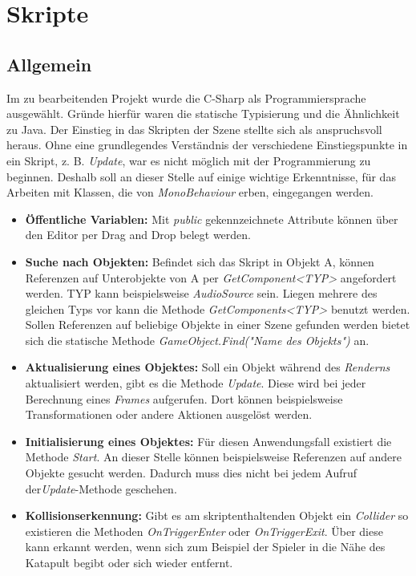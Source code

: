 \section{Skripte}
\subsection{Allgemein}
Im zu bearbeitenden Projekt wurde die C-Sharp als Programmiersprache ausgewählt. Gründe hierfür waren die statische Typisierung und die Ähnlichkeit zu Java. Der Einstieg in das Skripten der Szene stellte sich als anspruchsvoll heraus. Ohne eine grundlegendes Verständnis der verschiedene Einstiegspunkte in ein Skript, z. B. \textit{Update}, war es nicht möglich mit der Programmierung zu beginnen. Deshalb soll an dieser Stelle auf einige wichtige Erkenntnisse, für das Arbeiten mit Klassen, die von \textit{MonoBehaviour} erben, eingegangen werden.

\begin{itemize}
	\item \textbf{Öffentliche Variablen:} Mit \textit{public} gekennzeichnete Attribute können über den Editor per Drag and Drop belegt werden.
	\item \textbf{Suche nach Objekten:} Befindet sich das Skript in Objekt A, können Referenzen auf Unterobjekte von A per \textit{GetComponent<TYP>} angefordert werden. TYP kann beispielsweise \textit{AudioSource} sein. Liegen mehrere des gleichen Typs vor kann die Methode \textit{GetComponents<TYP>} benutzt werden. Sollen Referenzen auf beliebige Objekte in einer Szene gefunden werden bietet sich die statische Methode \textit{GameObject.Find("Name des Objekts")} an.
	\item \textbf{Aktualisierung eines Objektes:} Soll ein Objekt während des \textit{Renderns} aktualisiert werden, gibt es die Methode \textit{Update}. Diese wird bei jeder Berechnung eines \textit{Frames} aufgerufen. Dort können beispielsweise Transformationen oder andere Aktionen ausgelöst werden.
	\item \textbf{Initialisierung eines Objektes:} Für diesen Anwendungsfall existiert die Methode \textit{Start}. An dieser Stelle können beispielsweise Referenzen auf andere Objekte gesucht werden. Dadurch muss dies nicht bei jedem Aufruf der\textit{Update}-Methode geschehen.
	\item \textbf{Kollisionserkennung:} Gibt es am skriptenthaltenden Objekt ein \textit{Collider} so existieren die Methoden \textit{OnTriggerEnter} oder \textit{OnTriggerExit}. Über diese kann erkannt werden, wenn sich zum Beispiel der Spieler in die Nähe des Katapult begibt oder sich wieder entfernt.
\end{itemize}

